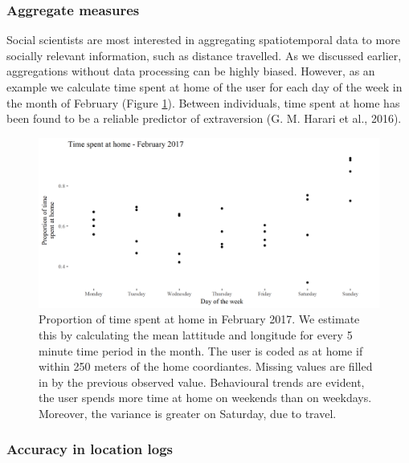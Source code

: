 \documentclass[english,man]{apa6}
\theoremstyle{definition}
\theoremstyle{definition}
\theoremstyle{definition}
\theoremstyle{remark}
\begin{document}
\subsubsection{Aggregate measures}\label{aggregate-measures}

Social scientists are most interested in aggregating spatiotemporal data
to more socially relevant information, such as distance travelled. As we
discussed earlier, aggregations without data processing can be highly
biased. However, as an example we calculate time spent at home of the
user for each day of the week in the month of February (Figure
\ref{fig:aggrePlot}). Between individuals, time spent at home has been
found to be a reliable predictor of extraversion (G. M. Harari et al.,
2016).

\begin{figure}
\includegraphics[width=1\linewidth]{img/timeUse} \caption{Proportion of time spent at home in February 2017. We estimate this by calculating the mean lattitude and longitude for every 5 minute time period in the month. The user is coded as at home if within 250 meters of the home coordiantes. Missing values are filled in by the previous observed value. Behavioural trends are evident, the user spends more time at home on weekends than on weekdays. Moreover, the variance is greater on Saturday, due to travel.}\label{fig:aggrePlot}
\end{figure}

\subsubsection{Accuracy in location
logs}\label{accuracy-in-location-logs}
\end{document}
